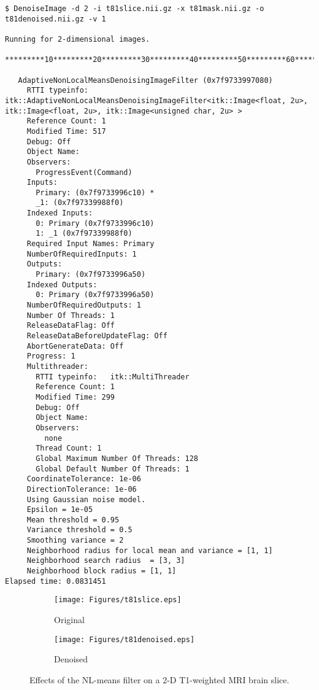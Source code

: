 \documentclass{InsightArticle}
\begin{document}
\small
\begin{verbatim}
$ DenoiseImage -d 2 -i t81slice.nii.gz -x t81mask.nii.gz -o t81denoised.nii.gz -v 1

Running for 2-dimensional images.

*********10*********20*********30*********40*********50*********60*********70*********80*********90*********

   AdaptiveNonLocalMeansDenoisingImageFilter (0x7f9733997080)
     RTTI typeinfo:   itk::AdaptiveNonLocalMeansDenoisingImageFilter<itk::Image<float, 2u>, itk::Image<float, 2u>, itk::Image<unsigned char, 2u> >
     Reference Count: 1
     Modified Time: 517
     Debug: Off
     Object Name:
     Observers:
       ProgressEvent(Command)
     Inputs:
       Primary: (0x7f9733996c10) *
       _1: (0x7f97339988f0)
     Indexed Inputs:
       0: Primary (0x7f9733996c10)
       1: _1 (0x7f97339988f0)
     Required Input Names: Primary
     NumberOfRequiredInputs: 1
     Outputs:
       Primary: (0x7f9733996a50)
     Indexed Outputs:
       0: Primary (0x7f9733996a50)
     NumberOfRequiredOutputs: 1
     Number Of Threads: 1
     ReleaseDataFlag: Off
     ReleaseDataBeforeUpdateFlag: Off
     AbortGenerateData: Off
     Progress: 1
     Multithreader:
       RTTI typeinfo:   itk::MultiThreader
       Reference Count: 1
       Modified Time: 299
       Debug: Off
       Object Name:
       Observers:
         none
       Thread Count: 1
       Global Maximum Number Of Threads: 128
       Global Default Number Of Threads: 1
     CoordinateTolerance: 1e-06
     DirectionTolerance: 1e-06
     Using Gaussian noise model.
     Epsilon = 1e-05
     Mean threshold = 0.95
     Variance threshold = 0.5
     Smoothing variance = 2
     Neighborhood radius for local mean and variance = [1, 1]
     Neighborhood search radius  = [3, 3]
     Neighborhood block radius = [1, 1]
Elapsed time: 0.0831451
\end{verbatim}
\normalsize

\begin{figure}[!ht]
\begin{subfigure}{0.5\textwidth}
  \centering
  \texttt{[image: Figures/t81slice.eps]}
  \caption{Original}
\end{subfigure}
\begin{subfigure}{0.5\textwidth}
  \centering
  \texttt{[image: Figures/t81denoised.eps]}
  \caption{Denoised}
\end{subfigure}
\caption{Effects of the NL-means filter on a 2-D T1-weighted MRI brain slice.}
\end{figure}
\end{document}
